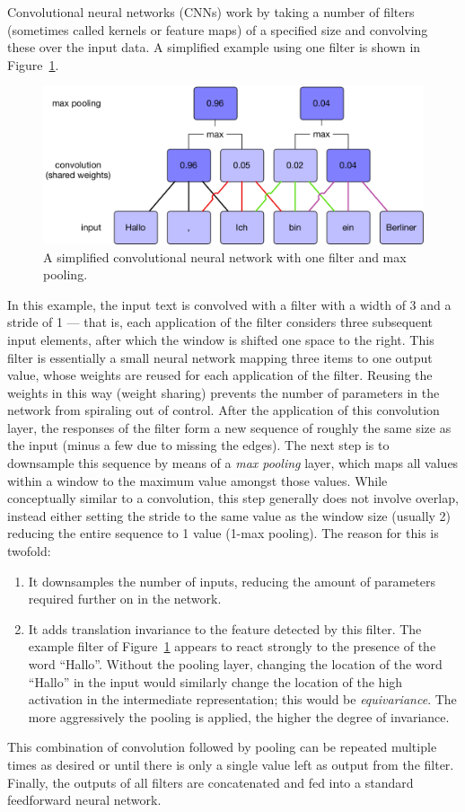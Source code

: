 Convolutional neural networks (CNNs) work by taking a number of filters
(sometimes called kernels or feature maps) of a specified size and convolving
these over the input data. A simplified example using one filter is shown in
Figure~\ref{fig:cnn}.
\begin{figure}[htb]
  \centering
  \includegraphics[width=\textwidth]{figures/cnn.pdf}
  \caption{A simplified convolutional neural network with one filter and
    max pooling.}%
  \label{fig:cnn}
\end{figure}
In this example, the input text is convolved with a filter with a width of 3 and
a stride of 1 --- that is, each application of the filter considers three
subsequent input elements, after which the window is shifted one space to the
right. This filter is essentially a small neural network mapping three items to
one output value, whose weights are reused for each application of the filter.
Reusing the weights in this way (weight sharing) prevents the number of
parameters in the network from spiraling out of control.
\citep{lecun1995convolutional} After the application of this convolution layer,
the responses of the filter form a new sequence of roughly the same size as the
input (minus a few due to missing the edges). The next step is to downsample
this sequence by means of a \emph{max pooling} layer, which maps all values
within a window to the maximum value amongst those values. While conceptually
similar to a convolution, this step generally does not involve overlap, instead
either setting the stride to the same value as the window size (usually 2)
reducing the entire sequence to 1 value (1-max pooling). The reason for this is
twofold:
\begin{enumerate}
\item It downsamples the number of inputs, reducing the amount of parameters
  required further on in the network.
\item It adds translation invariance to the feature detected by this filter. The
  example filter of Figure~\ref{fig:cnn} appears to react strongly to the
  presence of the word ``Hallo''. Without the pooling layer, changing the
  location of the word ``Hallo'' in the input would similarly change the
  location of the high activation in the intermediate representation; this would
  be \emph{equivariance}. The more aggressively the pooling is applied, the
  higher the degree of invariance.
\end{enumerate}
This combination of convolution followed by pooling can be repeated multiple
times as desired or until there is only a single value left as output from the
filter. Finally, the outputs of all filters are concatenated and fed into a
standard feedforward neural network.

